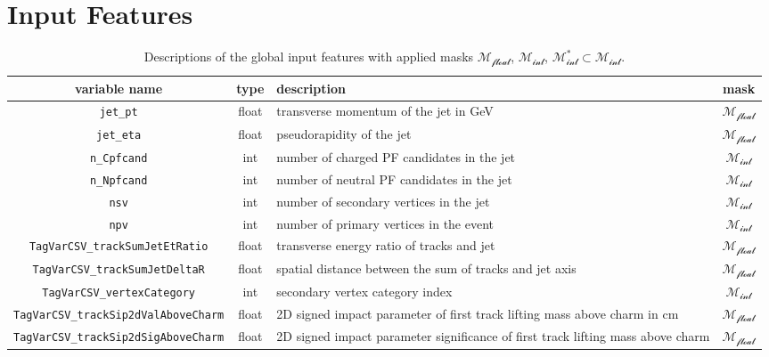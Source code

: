 \section{Input Features}

\begin{table}[ht]
\centering
\caption{Descriptions of the global input features with applied masks $\mathcal{M_{\text{float}}}$, $\mathcal{M_{\text{int}}}$, $\mathcal{M_{\text{int}}^*\subset M_{\text{int}}}$.}
\begin{tabularx}{\textwidth}{|c|c|X|c|}
\hline
\textbf{variable name} & \textbf{type} & \textbf{description} & \textbf{mask} \\
\hline
\texttt{jet\_pt} & float & transverse momentum of the jet in GeV & \cellcolor{green!50}$\mathcal{M_{\text{float}}}$ \\
\hline
\texttt{jet\_eta} & float & pseudorapidity of the jet & \cellcolor{green!50}$\mathcal{M_{\text{float}}}$ \\
\hline
\texttt{n\_Cpfcand} & int & number of charged PF candidates in the jet & \cellcolor{orange!50}$\mathcal{M_{\text{int}}}$ \\
\hline
\texttt{n\_Npfcand} & int & number of neutral PF candidates in the jet & \cellcolor{orange!50}$\mathcal{M_{\text{int}}}$ \\
\hline
\texttt{nsv} & int & number of secondary vertices in the jet & \cellcolor{orange!50}$\mathcal{M_{\text{int}}}$ \\
\hline
\texttt{npv} & int & number of primary vertices in the event & \cellcolor{orange!50}$\mathcal{M_{\text{int}}}$ \\
\hline
\texttt{TagVarCSV\_trackSumJetEtRatio} & float & transverse energy ratio of tracks and jet & \cellcolor{green!50}$\mathcal{M_{\text{float}}}$ \\
\hline
\texttt{TagVarCSV\_trackSumJetDeltaR} & float & spatial distance between the sum of tracks and jet axis & \cellcolor{green!50}$\mathcal{M_{\text{float}}}$ \\
\hline
\texttt{TagVarCSV\_vertexCategory} & int & secondary vertex category index & \cellcolor{orange!50}$\mathcal{M_{\text{int}}}$ \\
\hline
\texttt{TagVarCSV\_trackSip2dValAboveCharm} & float & 2D signed impact parameter of first track lifting mass above charm in cm & \cellcolor{green!50}$\mathcal{M_{\text{float}}}$ \\
\hline
\texttt{TagVarCSV\_trackSip2dSigAboveCharm} & float & 2D signed impact parameter significance of first track lifting mass above charm & \cellcolor{green!50}$\mathcal{M_{\text{float}}}$ \\

\end{tabularx}
\end{table}
